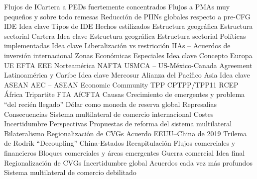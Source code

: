 \documentclass{nuevotema}
\begin{document}
\begin{esquema}[enumerate]
			\3[v] Flujos de ICartera a PEDs fuertemente concentrados
			\3[vi] Flujos a PMAs muy pequeños y sobre todo remesas
			\3[vii] Reducción de PIINs globales respecto  a pre-CFG
		\2 IDE
			\3 Idea clave
			\3 Tipos de IDE
			\3 Hechos estilizados
			\3 Estructura geográfica
			\3 Estructura sectorial
		\2 Cartera
			\3 Idea clave
			\3 Estructura geográfica
			\3 Estructura sectorial
		\2 Políticas implementadas
			\3 Idea clave
			\3 Liberalización vs restricción
			\3 IIAs -- Acuerdos de inversión internacional
			\3 Zonas Económicas Especiales
	\1 
		\2 Idea clave
			\3 Concepto
		\2 Europa
			\3 UE
			\3 EFTA
			\3 EEE
		\2 Norteamérica
			\3 NAFTA
			\3 USMCA -- US-México-Canada Agreement
		\2 Latinoamérica y Caribe
			\3 Idea clave
			\3 Mercosur
			\3 Alianza del Pacífico
		\2 Asia
			\3 Idea clave
			\3 ASEAN
			\3 AEC -- ASEAN Economic Community
			\3 TPP
			\3 CPTPP/TPP11
			\3 RCEP
		\2 África
			\3 Tripartite FTA
			\3 AfCFTA
	\1 
		\2 Causas
			\3 Crecimiento de emergentes y problema ``del recién llegado''
			\3 Dólar como moneda de reserva global
			\3 Represalias
		\2 Consecuencias
			\3 Sistema multilateral de comercio internacional
			\3 Costes
			\3 Incertidumbre
		\2 Perspectivas
			\3 Propuestas de reforma del sistema multilateral
			\3 Bilateralismo
			\3 Regionalización de CVGs
			\3 Acuerdo EEUU--China de 2019
			\3 Trilema de Rodrik
			\3 ``Decoupling'' China-Estados
	\1[] 
		\2 Recapitulación
			\3 Flujos comerciales y financieros
			\3 Bloques comerciales y áreas emergentes
			\3 Guerra comercial
		\2 Idea final
			\3 Regionalización de CVGs
			\3 Incertidumbre global
			\3 Acuerdos cada vez más profundos
			\3 Sistema multilateral de comercio debilitado

\end{esquema}

\esquemalargo
\end{document}
